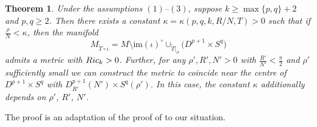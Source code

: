 \documentclass[11pt]{article}
\numberwithin{equation}{section}
\numberwithin{equation}{section}
\newtheorem{Theorem}{Theorem}[section]
\begin{document}
\begin{Theorem}\label{surgery}
	Under the assumptions $(1)$--$(3)$, suppose $k\geq\max\{p,q \}+2$ and $p,q\geq2$. Then there exists a constant $\kappa=\kappa(p,q,k,R/N,T)>0$ such that if $\frac{\rho}{N}<\kappa$, then the manifold
	\[M_{\tilde{T}\circ\iota}=M\setminus\mathrm{im}(\iota)^\circ\cup_{\tilde{T}|_\partial} \bigl(D^{p+1}\times S^q\bigr) \]
	admits a metric with ${\rm Ric}_k>0$. Further, for any $\rho',R',N'>0$ with $\frac{R'}{N'}<\frac{\pi}{2}$ and $\rho'$ sufficiently small we can construct the metric to coincide near the centre of $D^{p+1}\times S^q$ with $D^{p+1}_{R'}(N')\times S^q(\rho')$. In this case, the constant $\kappa$ additionally depends on $\rho'$, $R'$, $N'$.
\end{Theorem}
The proof is an adaptation of the proof of \cite[Theorem 0.3]{Wr2} to our situation.
\end{document}
